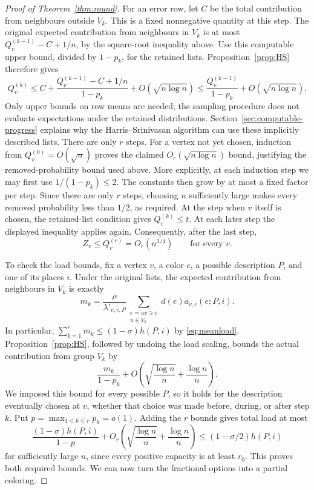 \documentclass[11pt]{article}
\theoremstyle{definition}\newtheorem{algorithm}{Algorithm}[section]
\numberwithin{equation}{section}
\theoremstyle{remark}\newtheorem*{remark}{Remark}
\begin{document}
\begin{proof}[Proof of Theorem~\ref{thm:round}]
For an error row, let $C$ be the total contribution from neighbours
outside $V_k$. This is a fixed nonnegative quantity at this step.
The original expected contribution from neighbours in $V_k$ is at most
$Q_v^{(k-1)}-C+1/n$, by the square-root inequality above.
Use this computable upper bound, divided by $1-p_k$, for the retained
lists. Proposition~\ref{prop:HS} therefore gives
\[
 Q_v^{(k)}
 \le C+\frac{Q_v^{(k-1)}-C+1/n}{1-p_k}
       +O(\sqrt{n\log n})
 \le\frac{Q_v^{(k-1)}}{1-p_k}+O(\sqrt{n\log n}).
\]
Only upper bounds on row means are needed; the sampling procedure does
not evaluate expectations under the retained distributions.
Section~\ref{sec:computable-progress} explains why the
Harris--Srinivasan algorithm can use these implicitly described lists.
There are only $r$ steps. For a vertex not yet chosen, induction from
$Q_v^{(0)}=O(\sqrt n)$ proves the claimed
$O_r(\sqrt{n\log n})$ bound, justifying the removed-probability bound
used above. More explicitly, at each induction step we may first use
$1/(1-p_k)\le2$. The constants then grow by at most a fixed factor
per step. Since there are only $r$ steps, choosing $n$ sufficiently
large makes every removed probability less than $1/2$, as required.
At the step when $v$ itself is chosen, the retained-list
condition gives $Q_v^{(k)}\le t$. At each later step the displayed
inequality applies again. Consequently, after the last step,
\[
 Z_v\le Q_v^{(r)}=O_r(n^{3/4})\qquad\text{for every }v.
\]

To check the load bounds, fix a vertex $v$, a color $c$, a possible
description $P$, and one of its places $i$. Under the original lists,
the expected contribution from neighbours in $V_k$ is exactly
\[
 m_k=\frac{\rho}{\lambda'_{v,c,P}}
       \sum_{\substack{e=uv\ni v\\u\in V_k}}
                d(e)a_{v,c}(e;P,i).
\]
In particular, $\sum_{k=1}^r m_k\le(1-\sigma)h(P,i)$ by
\eqref{eq:meanload}. Proposition~\ref{prop:HS}, followed by undoing
the load scaling, bounds the actual contribution from group $V_k$ by
\[
 \frac{m_k}{1-p_k}
 +O\left(\sqrt{\frac{\log n}{n}}+\frac{\log n}{n}\right).
\]
We imposed this bound for every possible $P$, so it holds for the
description eventually chosen at $v$, whether that choice was made
before, during, or after step $k$. Put $p=\max_{1\le k\le r}p_k=o(1)$.
Adding the $r$ bounds gives total load at most
\[
 \frac{(1-\sigma)h(P,i)}{1-p}
 +O_r\left(\sqrt{\frac{\log n}{n}}+\frac{\log n}{n}\right)
 \le(1-\sigma/2)h(P,i)
\]
for sufficiently large $n$, since every positive capacity is at least
$r_0$. This proves both required bounds. We can now turn the fractional options into a partial coloring.



\end{proof}
\end{document}
